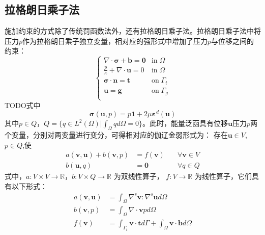 \subsection{拉格朗日乘子法}
施加约束的方式除了传统罚函数法外，还有拉格朗日乘子法。拉格朗日乘子法中将压力$p$作为拉格朗日乘子独立变量，相对应的强形式中增加了压力$p$与位移之间的约束：
\begin{equation}\label{strong_mix}
    \begin{cases}
        \nabla \cdot \boldsymbol \sigma + \boldsymbol b = \boldsymbol 0 & \mathrm{in} \; \Omega \\
        \frac{p}{\kappa} + \nabla \cdot \boldsymbol u = 0 & \mathrm{in} \; \Omega \\
        \boldsymbol \sigma \cdot \boldsymbol n = \boldsymbol t & \mathrm{on} \; \Gamma_t \\
        \boldsymbol u = \boldsymbol g & \mathrm{on} \; \Gamma_g \\
    \end{cases}
\end{equation}
TODO式中
\begin{equation}\label{stress_mix}
    \boldsymbol \sigma(\boldsymbol u, p) = p \boldsymbol 1 + 2\mu \boldsymbol \varepsilon^d(\boldsymbol u)
\end{equation}
其中$p\in Q$，$Q = \{q \in L^2(\Omega) \vert \int_{\Omega} q d\Omega = 0\}$。此时，能量泛函具有位移$\boldsymbol u$压力$p$两个变量，分别对两变量进行变分，可得相对应的伽辽金弱形式为：
存在$\boldsymbol u \in V$, $p \in Q$,使
\begin{equation}\label{weak_mix}
    \begin{aligned}
        a(\boldsymbol v, \boldsymbol u) + b(\boldsymbol v, p) &= f(\boldsymbol v) \quad &\forall \boldsymbol v \in V \\
        b(\boldsymbol u, q) &= \boldsymbol 0 \quad &\forall q \in Q
    \end{aligned}
\end{equation}
式中，$a: V\times V\rightarrow \mathbb R$，$b: V\times Q\rightarrow \mathbb R$ 为双线性算子， $f: V \rightarrow \mathbb R$ 为线性算子，它们具有以下形式：
\begin{align}
    a(\boldsymbol v, \boldsymbol u) &= \int_\Omega \nabla^s \boldsymbol v : \nabla^s \boldsymbol u d\Omega \\
    b(\boldsymbol v, p) &= \int_\Omega \nabla \cdot \boldsymbol v p d\Omega \\
    f(\boldsymbol v) &= \int_{\Gamma_t} \boldsymbol v \cdot \boldsymbol t d\Gamma + \int_{\Omega} \boldsymbol v \cdot \boldsymbol b d\Omega
\end{align}

